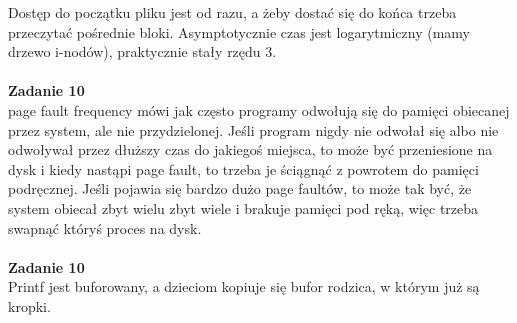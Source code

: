 \documentclass[12pt, a4paper, polish, openany]{book}
\begin{document}
Dostęp do początku pliku jest od razu, a żeby dostać się do końca trzeba przeczytać pośrednie bloki. Asymptotycznie czas jest logarytmiczny (mamy drzewo i-nodów), praktycznie stały rzędu 3. \\\\
\textbf{Zadanie 10} \\
page fault frequency mówi jak często programy odwołują się do pamięci obiecanej przez system, ale nie przydzielonej. Jeśli program nigdy nie odwołał się albo nie odwoływał przez dłuższy czas do jakiegoś miejsca, to może być przeniesione na dysk i kiedy nastąpi page fault, to trzeba je ściągnąć z powrotem do pamięci podręcznej. Jeśli pojawia się bardzo dużo page faultów, to może tak być, że system obiecał zbyt wielu zbyt wiele i brakuje pamięci pod ręką, więc trzeba swapnąć któryś proces na dysk. \\\\
\textbf{Zadanie 10} \\
Printf jest buforowany, a dzieciom kopiuje się bufor rodzica, w którym już są kropki.
\end{document}
